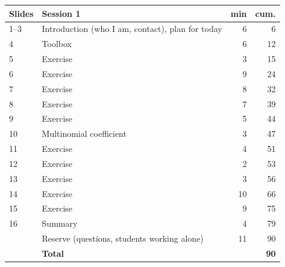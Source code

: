 \documentclass[11pt,a4paper,parskip=half]{scrartcl}
\begin{document}
\begin{center}
	\small
	\begin{tabular}{@{}llrr@{}}
		\toprule
		Slides & Session 1 & min & cum. \\\midrule
		1--3 & Introduction (who I am, contact), plan for today & 6 & 6 \\
		4 & Toolbox & 6 & 12 \\
		5 & Exercise~\exref{license-plates} & 3 & 15 \\
		6 & Exercise~\exref{couples-at-a-concert} & 9 & 24 \\
		7 & Exercise~\exref{bus-queue} & 8 & 32 \\
		8 & Exercise~\exref{letter-arrangements} & 7 & 39 \\
		9 & Exercise~\exref{eight-digit-numbers} & 5 & 44 \\
		10 & Multinomial coefficient & 3 & 47 \\
		11 & Exercise~\exref{dividing-into-groups} & 4 & 51 \\
		12 & Exercise~\exref{rating-bonds} & 2 & 53 \\
		13 & Exercise~\exref{up-and-down-days} & 3 & 56 \\
		14 & Exercise~\exref{committees} & 10 & 66 \\
		15 & Exercise~\exref{lattice-paths} & 9 & 75 \\
		16 & Summary & 4 & 79 \\
		       & Reserve (questions, students working alone) & 11 & 90 \\\midrule
		       & \textbf{Total} & & \textbf{90} \\\bottomrule
	\end{tabular}
\end{center}
\end{document}
